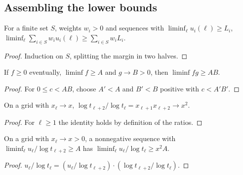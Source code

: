 \documentclass[11pt]{article}
\begin{document}
\subsection{Assembling the lower bounds}

\begin{lemma}\label{flem:liminf-sum}
\uses{}
For a finite set $S$, weights $w_i>0$ and sequences with $\liminf_\ell u_i(\ell)\ge L_i$,
$\liminf_\ell\sum_{i\in S}w_iu_i(\ell)\ge\sum_{i\in S}w_iL_i$.
\end{lemma}

\begin{proof}
\uses{}
Induction on $S$, splitting the margin in two halves.
\end{proof}

\begin{lemma}\label{flem:liminf-mul}
\uses{}
If $f\ge0$ eventually, $\liminf f\ge A$ and $g\to B>0$, then $\liminf fg\ge AB$.
\end{lemma}

\begin{proof}
\uses{}
For $0\le c<AB$, choose $A'<A$ and $B'<B$ positive with $c<A'B'$.
\end{proof}

\begin{lemma}\label{flem:log-ratio}
On a grid with $x_\ell\to x$, $\log t_{\ell+2}/\log t_\ell=x_{\ell+1}x_{\ell+2}\to x^2$.
\end{lemma}

\begin{proof}
For $\ell\ge1$ the identity holds by definition of the ratios.
\end{proof}

\begin{lemma}\label{flem:caseA}
On a grid with $x_\ell\to x>0$, a nonnegative sequence with $\liminf_\ell u_\ell/\log t_{\ell+2}\ge A$
has $\liminf_\ell u_\ell/\log t_\ell\ge x^2A$.
\end{lemma}

\begin{proof}
$u_\ell/\log t_\ell=(u_\ell/\log t_{\ell+2})\cdot(\log t_{\ell+2}/\log t_\ell)$.
\end{proof}
\end{document}
